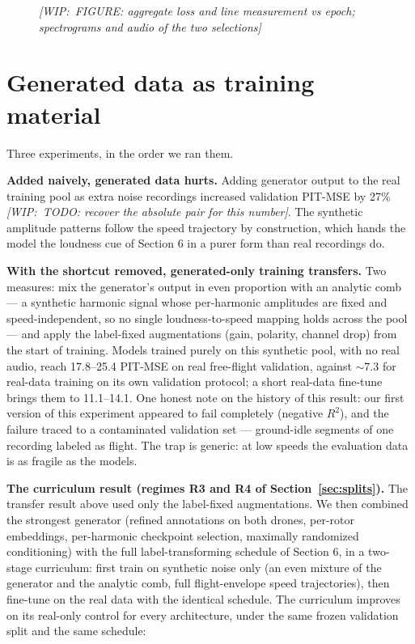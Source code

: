 \documentclass[journal]{IEEEtran}
\newcommand{\wip}[1]{{\color{gray!70!black}\textit{[WIP:~#1]}}}
\newcommand{\figbox}[1]{\framebox[\columnwidth]{\rule{0pt}{#1}}}
\begin{document}
\begin{figure}[t]
  \centering
  \figbox{7em}
  \caption{\wip{FIGURE: aggregate loss and line measurement vs epoch;
      spectrograms and audio of the two selections}}
  \label{fig:line-vs-loss}
\end{figure}

\section{Generated data as training material}
\label{sec:generated-data}

Three experiments, in the order we ran them.

\textbf{Added naively, generated data hurts.} Adding generator output to the
real training pool as extra noise recordings increased validation PIT-MSE by
27\% \wip{TODO: recover the absolute pair for this number}. The synthetic
amplitude patterns follow the speed trajectory by construction, which hands
the model the loudness cue of Section 6 in a purer form than real
recordings do.

\textbf{With the shortcut removed, generated-only training transfers.} Two
measures: mix the generator's output in even proportion with an analytic
comb --- a synthetic harmonic signal whose per-harmonic amplitudes are fixed
and speed-independent, so no single loudness-to-speed mapping holds across
the pool --- and apply the label-fixed augmentations (gain, polarity, channel
drop) from the start of training. Models trained purely on this synthetic
pool, with no real audio, reach 17.8--25.4 PIT-MSE on real free-flight
validation, against $\sim$7.3 for real-data training on its own validation
protocol; a short real-data fine-tune brings them to 11.1--14.1. One honest
note on the history of this result: our first version of this experiment
appeared to fail completely (negative $R^2$), and the failure traced to a
contaminated validation set --- ground-idle segments of one recording labeled
as flight. The trap is generic: at low speeds the evaluation data is as
fragile as the models.

\textbf{The curriculum result (regimes R3 and R4 of
Section~\ref{sec:splits}).} The transfer result above used only the
label-fixed augmentations. We then combined the strongest generator (refined
annotations on both drones, per-rotor embeddings, per-harmonic checkpoint
selection, maximally randomized conditioning) with the full label-transforming
schedule of Section 6, in a two-stage curriculum: first train on synthetic
noise only (an even mixture of the generator and the analytic comb, full
flight-envelope speed trajectories), then fine-tune on the real data with the
identical schedule. The curriculum improves on its real-only control for
every architecture, under the same frozen validation split and the same
schedule:
\end{document}
